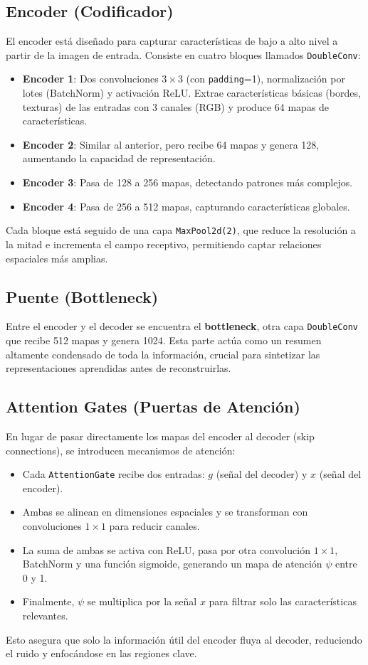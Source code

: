\subsection*{Encoder (Codificador)}
El encoder está diseñado para capturar características de bajo a alto nivel a partir de la imagen de entrada. Consiste en cuatro bloques llamados \texttt{DoubleConv}:
\begin{itemize}
    \item \textbf{Encoder 1}: Dos convoluciones $3\times3$ (con \texttt{padding}=1), normalización por lotes (BatchNorm) y activación ReLU. Extrae características básicas (bordes, texturas) de las entradas con 3 canales (RGB) y produce 64 mapas de características.
    \item \textbf{Encoder 2}: Similar al anterior, pero recibe 64 mapas y genera 128, aumentando la capacidad de representación.
    \item \textbf{Encoder 3}: Pasa de 128 a 256 mapas, detectando patrones más complejos.
    \item \textbf{Encoder 4}: Pasa de 256 a 512 mapas, capturando características globales.
\end{itemize}
Cada bloque está seguido de una capa \texttt{MaxPool2d(2)}, que reduce la resolución a la mitad e incrementa el campo receptivo, permitiendo captar relaciones espaciales más amplias.

\subsection*{Puente (Bottleneck)}
Entre el encoder y el decoder se encuentra el \textbf{bottleneck}, otra capa \texttt{DoubleConv} que recibe 512 mapas y genera 1024. Esta parte actúa como un resumen altamente condensado de toda la información, crucial para sintetizar las representaciones aprendidas antes de reconstruirlas.

\subsection*{Attention Gates (Puertas de Atención)}
En lugar de pasar directamente los mapas del encoder al decoder (skip connections), se introducen mecanismos de atención:
\begin{itemize}
    \item Cada \texttt{AttentionGate} recibe dos entradas: $g$ (señal del decoder) y $x$ (señal del encoder).
    \item Ambas se alinean en dimensiones espaciales y se transforman con convoluciones $1\times1$ para reducir canales.
    \item La suma de ambas se activa con ReLU, pasa por otra convolución $1\times1$, BatchNorm y una función sigmoide, generando un mapa de atención $\psi$ entre 0 y 1.
    \item Finalmente, $\psi$ se multiplica por la señal $x$ para filtrar solo las características relevantes.
\end{itemize}
Esto asegura que solo la información útil del encoder fluya al decoder, reduciendo el ruido y enfocándose en las regiones clave.

